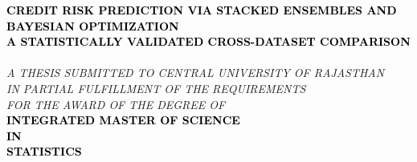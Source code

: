 \begin{titlepage}
\newpage
\pagecolor{White}



\begin{center}

\textcolor{Black}{\textbf{ \Large \vspace{0.2cm} CREDIT RISK PREDICTION VIA STACKED ENSEMBLES AND BAYESIAN OPTIMIZATION \\[0.4cm] A STATISTICALLY VALIDATED CROSS-DATASET COMPARISON}} \\[0.3cm] %

 \textit{ \\ A THESIS SUBMITTED TO CENTRAL UNIVERSITY OF RAJASTHAN \\[0.1cm] IN PARTIAL FULFILLMENT OF
 THE REQUIREMENTS\\[0.1cm] FOR THE AWARD OF THE DEGREE OF}\\ [1cm]
\textcolor{Black}{\large \vspace{0.4cm} \textbf{INTEGRATED MASTER OF SCIENCE \\
IN\\
\vspace{0.4cm} STATISTICS}} \\[1cm]


\end{center}
\end{titlepage}
